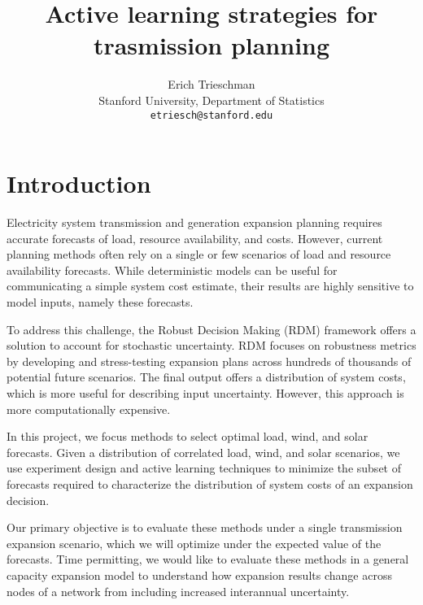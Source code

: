 \documentclass[10pt,twocolumn,letterpaper]{article}
\begin{document}
\title{Active learning strategies for trasmission planning}

\author{Erich Trieschman\\
Stanford University, Department of Statistics\\
{\tt\small etriesch@stanford.edu}
}
\maketitle

  

\section{Introduction}
\label{sec:intro}

Electricity system transmission and generation expansion planning requires accurate forecasts of load, resource availability, and costs. However, current planning methods often rely on a single or few scenarios of load and resource availability forecasts. While deterministic models can be useful for communicating a simple system cost estimate, their results are highly sensitive to model inputs, namely these forecasts.

To address this challenge, the Robust Decision Making (RDM) framework offers a solution to account for stochastic uncertainty. RDM focuses on robustness metrics by developing and stress-testing expansion plans across hundreds of thousands of potential future scenarios. The final output offers a distribution of system costs, which is more useful for describing input uncertainty. However, this approach is more computationally expensive.

In this project, we focus methods to select optimal load, wind, and solar forecasts. Given a distribution of correlated load, wind, and solar scenarios, we use experiment design and active learning techniques to minimize the subset of forecasts required to characterize the distribution of system costs of an expansion decision.

Our primary objective is to evaluate these methods under a single transmission expansion scenario, which we will optimize under the expected value of the forecasts. Time permitting, we would like to evaluate these methods in a general capacity expansion model to understand how expansion results change across nodes of a network from including increased interannual uncertainty.
\end{document}
